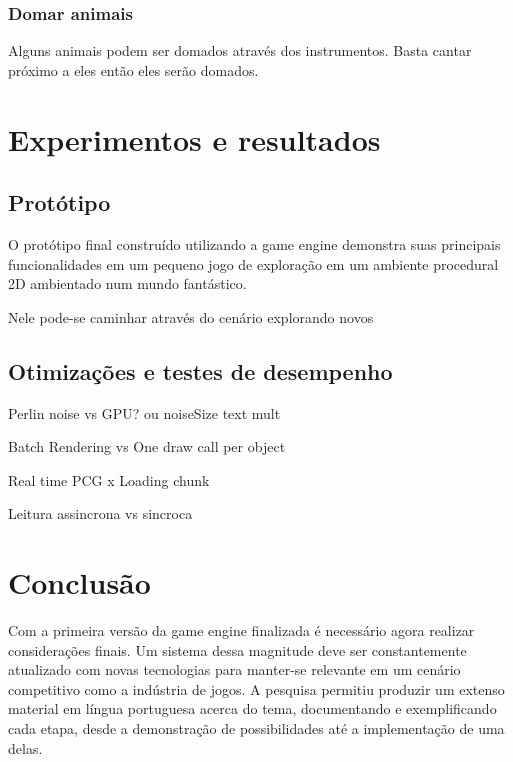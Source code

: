 \documentclass[12pt, 
openright, 
oneside, 
a4paper,    
brazil]{facom-ufu-abntex2}
\begin{document}
\subsection{Domar animais}
Alguns animais podem ser domados através dos instrumentos. Basta cantar próximo a eles então eles serão domados.


\chapter{Experimentos e resultados}
\label{sec:experim}

\section{Protótipo}

O protótipo final construído utilizando a game engine demonstra suas principais funcionalidades em um pequeno jogo de exploração em um ambiente procedural 2D ambientado num mundo fantástico.

Nele pode-se caminhar através do cenário explorando novos 

\section{Otimizações e testes de desempenho}

Perlin noise  vs GPU? ou noiseSize text mult

Batch Rendering vs One draw call per object

Real time PCG x Loading chunk

Leitura assincrona vs sincroca




\chapter{Conclusão}
\label{sec:conclus}
Com a primeira versão da game engine finalizada é necessário agora realizar considerações finais. Um sistema dessa magnitude deve ser constantemente atualizado com novas tecnologias para manter-se relevante em um cenário competitivo como a indústria de jogos. A pesquisa permitiu produzir um extenso material em língua portuguesa acerca do tema, documentando e exemplificando cada etapa, desde a demonstração de possibilidades até a implementação de uma delas.
\end{document}
